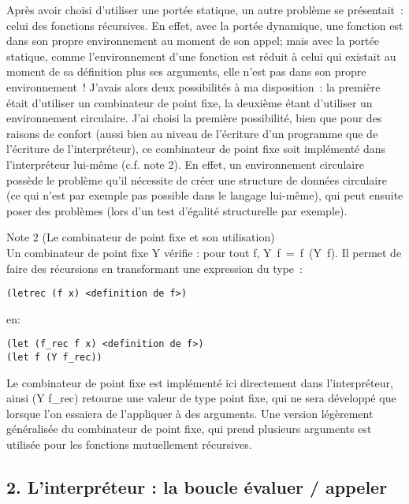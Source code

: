 \documentclass[a4paper,11pt]{article}
\newcommand{\code}[1]{{\fontfamily{pcr}\selectfont #1}}
\begin{document}
Après avoir choisi d'utiliser une portée statique, un autre problème
se présentait~: celui des fonctions récursives. En effet, avec la
portée dynamique, une fonction est dans son propre environnement au
moment de son appel; mais avec la portée statique, comme
l'environnement d'une fonction est réduit à celui qui existait au
moment de sa définition plus ses arguments, elle n'est pas dans son
propre environnement~! J'avais alors deux possibilités à ma
disposition~: la première était d'utiliser un combinateur de point
fixe, la deuxième étant d'utiliser un environnement circulaire. J'ai
choisi la première possibilité, bien que pour des raisons de confort
(aussi bien au niveau de l'écriture d'un programme que de l'écriture
de l'interpréteur), ce combinateur de point fixe soit implémenté dans
l'interpréteur lui-même (c.f. note 2). En effet, un environnement
circulaire possède le problème qu'il nécessite de créer une structure
de données circulaire (ce qui n'est par exemple pas possible dans le
langage lui-même), qui peut ensuite poser des problèmes (lors d'un
test d'égalité structurelle par exemple). \\

\begin{tcolorbox}
{\Large Note 2 \normalsize (Le combinateur de point fixe et son utilisation)} \\
  Un combinateur de point fixe \code{Y} vérifie : pour tout \code{f},
  \code{Y~f~=~f~(Y~f)}.  Il permet de faire des récursions en
  transformant une expression du type~:
\begin{lstlisting}
(letrec (f x) <definition de f>)
\end{lstlisting}
en:
\begin{lstlisting}
(let (f_rec f x) <definition de f>)
(let f (Y f_rec))
\end{lstlisting}
Le combinateur de point fixe est implémenté ici directement dans
l'interpréteur, ainsi \code{(Y f\_rec)} retourne une valeur de type
point fixe, qui ne sera développé que lorsque l'on essaiera de
l'appliquer à des arguments.  Une version légèrement généralisée du
combinateur de point fixe, qui prend plusieurs arguments est utilisée
pour les fonctions mutuellement récursives.
\end{tcolorbox}

\subsection{2. L'interpréteur : la boucle évaluer / appeler}
\end{document}
